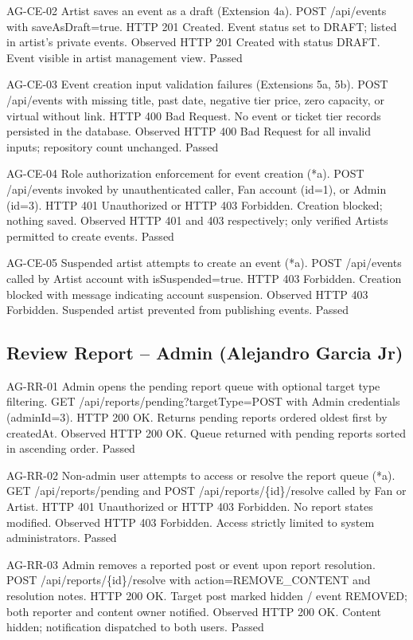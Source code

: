 \documentclass[11pt]{report}
\begin{document}
\clearpage
\alextestcase
{AG-CE-02}
{Artist saves an event as a draft (Extension 4a).}
{POST /api/events with saveAsDraft=true.}
{HTTP 201 Created. Event status set to DRAFT; listed in artist's private events.}
{Observed HTTP 201 Created with status DRAFT. Event visible in artist management view.}
{Passed}

\alextestcase
{AG-CE-03}
{Event creation input validation failures (Extensions 5a, 5b).}
{POST /api/events with missing title, past date, negative tier price, zero capacity, or virtual without link.}
{HTTP 400 Bad Request. No event or ticket tier records persisted in the database.}
{Observed HTTP 400 Bad Request for all invalid inputs; repository count unchanged.}
{Passed}

\clearpage
\alextestcase
{AG-CE-04}
{Role authorization enforcement for event creation (*a).}
{POST /api/events invoked by unauthenticated caller, Fan account (id=1), or Admin (id=3).}
{HTTP 401 Unauthorized or HTTP 403 Forbidden. Creation blocked; nothing saved.}
{Observed HTTP 401 and 403 respectively; only verified Artists permitted to create events.}
{Passed}

\alextestcase
{AG-CE-05}
{Suspended artist attempts to create an event (*a).}
{POST /api/events called by Artist account with isSuspended=true.}
{HTTP 403 Forbidden. Creation blocked with message indicating account suspension.}
{Observed HTTP 403 Forbidden. Suspended artist prevented from publishing events.}
{Passed}

\clearpage
\subsection*{Review Report -- Admin (Alejandro Garcia Jr)}
\alextestcase
{AG-RR-01}
{Admin opens the pending report queue with optional target type filtering.}
{GET /api/reports/pending?targetType=POST with Admin credentials (adminId=3).}
{HTTP 200 OK. Returns pending reports ordered oldest first by createdAt.}
{Observed HTTP 200 OK. Queue returned with pending reports sorted in ascending order.}
{Passed}

\alextestcase
{AG-RR-02}
{Non-admin user attempts to access or resolve the report queue (*a).}
{GET /api/reports/pending and POST /api/reports/\{id\}/resolve called by Fan or Artist.}
{HTTP 401 Unauthorized or HTTP 403 Forbidden. No report states modified.}
{Observed HTTP 403 Forbidden. Access strictly limited to system administrators.}
{Passed}

\clearpage
\alextestcase
{AG-RR-03}
{Admin removes a reported post or event upon report resolution.}
{POST /api/reports/\{id\}/resolve with action=REMOVE\_CONTENT and resolution notes.}
{HTTP 200 OK. Target post marked hidden / event REMOVED; both reporter and content owner notified.}
{Observed HTTP 200 OK. Content hidden; notification dispatched to both users.}
{Passed}
\end{document}
